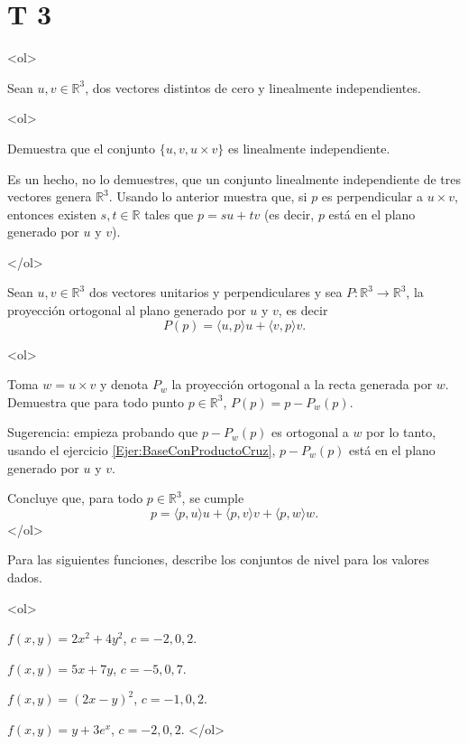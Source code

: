 \documentclass{article}
\theoremstyle{definition}
\begin{document}
  \section*{T 3}


<ol>

\item\label{Ejer:BaseConProductoCruz} Sean $u,v\in \mathbb{R}^3$, dos vectores distintos de cero y linealmente
  independientes.

<ol>
\item Demuestra que el conjunto
  $\{u,v, u\times v\}$ es linealmente independiente.
  \item Es un hecho, no lo demuestres, que un conjunto linealmente independiente de tres vectores genera
  $\mathbb{R}^3$. Usando lo anterior muestra que, si $p$ es perpendicular a $u\times v$, entonces existen
  $s,t\in \mathbb{R}$ tales que $p=su+tv$ (es decir, $p$ está en el plano generado por $u$ y $v$).
  
  </ol>

\item Sean $u,v\in \mathbb{R}^3$ dos vectores unitarios y perpendiculares y sea $P:\mathbb{R}^3 \to \mathbb{R}^3$,
la proyección ortogonal al plano generado por $u$ y $v$, es decir
$$
P(p)= \langle u,p\rangle u + \langle v, p \rangle v.
$$

<ol>
\item Toma $w=u\times v$ y denota $P_w$ la proyección ortogonal a la recta generada por $w$. Demuestra que para todo punto $p\in \mathbb{R}^3$, $P(p)=p-P_{w}(p)$. 
	
	Sugerencia: empieza probando que $p-P_w(p)$ es ortogonal a $w$ por lo tanto, usando el ejercicio \ref{Ejer:BaseConProductoCruz}, $p-P_w(p)$ está en el plano generado por $u$ y $v$.


\item Concluye que,  para todo
$p\in \mathbb{R}^3$, se cumple
$$
p=\langle p, u \rangle u + \langle p, v \rangle v + \langle p, w \rangle w.
$$
</ol>

\item Para las siguientes 	funciones, describe los conjuntos de nivel para los valores dados.
	
	<ol>
	\item $f(x,y)=2x^2+4y^2$, $c=-2,0,2$.
	\item $f(x,y)=5x+7y$, $c=-5,0,7$.
	\item $f(x,y)=(2x-y)^2$, $c=-1,0,2$.
	\item $f(x,y)=y+3e^x$, $c=-2,0,2$.
</ol>		
	
\end{document}
